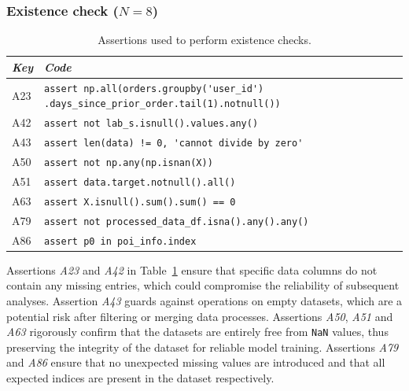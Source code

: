 
\subsubsection{Existence check ($N = 8$)}

\begin{table}
  \centering
  \caption{Assertions used to perform existence checks.}
  \begin{tabular}{@{}m{} m{}@{}}
    \toprule
    \emph{\textbf{Key}}&
    \emph{\textbf{Code}}\\
    \midrule

    A23 &
    \lstinline[]$assert np.all(orders.groupby('user_id') .days_since_prior_order.tail(1).notnull())$\\

    A42 &
    \lstinline[]$assert not lab_s.isnull().values.any()$\\

    A43 &
    \lstinline[]$assert len(data) != 0, 'cannot divide by zero'$\\

    A50 &
    \lstinline[]$assert not np.any(np.isnan(X))$\\

    A51 &
    \lstinline[]$assert data.target.notnull().all()$\\

    A63 &
    \lstinline[]$assert X.isnull().sum().sum() == 0$\\

    A79 &
    \lstinline[]$assert not processed_data_df.isna().any().any()$\\

    A86 &
    \lstinline[]$assert p0 in poi_info.index$\\
    \bottomrule
  \end{tabular}
  \label{tab:existence-check}
\end{table}

Assertions \emph{A23} and \emph{A42} in Table~\ref{tab:existence-check} ensure that specific data columns do not contain any missing entries, which could compromise the reliability of subsequent analyses. Assertion \emph{A43} guards against operations on empty datasets, which are a potential risk after filtering or merging data processes. Assertions \emph{A50}, \emph{A51} and \emph{A63} rigorously confirm that the datasets are entirely free from \texttt{NaN} values, thus preserving the integrity of the dataset for reliable model training. Assertions \emph{A79} and \emph{A86} ensure that no unexpected missing values are introduced and that all expected indices are present in the dataset respectively.

